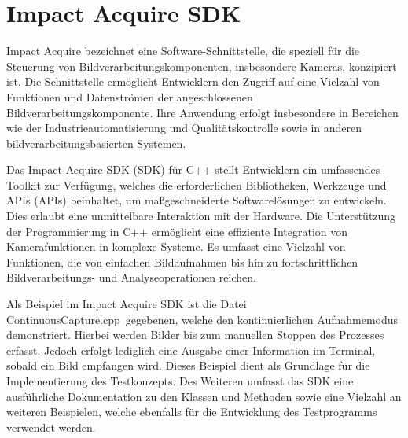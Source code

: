 \section{Impact Acquire SDK}

Impact Acquire bezeichnet eine Software-Schnittstelle, die speziell für die Steuerung von Bildverarbeitungskomponenten, insbesondere Kameras, konzipiert ist. 
Die Schnittstelle ermöglicht Entwicklern den Zugriff auf eine Vielzahl von Funktionen und Datenströmen der angeschlossenen Bildverarbeitungskomponente. 
Ihre Anwendung erfolgt insbesondere in Bereichen wie der Industrieautomatisierung und Qualitätskontrolle sowie in anderen bildverarbeitungsbasierten Systemen.

Das Impact Acquire \acs{SDK} (\acl{SDK}) für C++ stellt Entwicklern ein umfassendes Toolkit zur Verfügung, welches die erforderlichen Bibliotheken, Werkzeuge 
und \acl{API}s (\acs{API}s) beinhaltet, um maßgeschneiderte Softwarelösungen zu entwickeln. Dies erlaubt eine unmittelbare Interaktion mit der Hardware. 
Die Unterstützung der Programmierung in C++ ermöglicht eine effiziente Integration von Kamerafunktionen in komplexe Systeme. Es umfasst eine Vielzahl von Funktionen, die 
von einfachen Bildaufnahmen bis hin zu fortschrittlichen Bildverarbeitungs- und Analyseoperationen reichen.

Als Beispiel im Impact Acquire SDK ist die Datei \glqq ContinuousCapture.cpp\grqq\ gegebenen, welche den kontinuierlichen Aufnahmemodus demonstriert. Hierbei werden Bilder bis zum manuellen 
Stoppen des Prozesses erfasst. Jedoch erfolgt lediglich eine Ausgabe einer Information im Terminal, sobald ein Bild empfangen wird. Dieses Beispiel dient als Grundlage für 
die Implementierung des Testkonzepts. Des Weiteren umfasst das SDK eine ausführliche Dokumentation 
zu den Klassen und Methoden sowie eine Vielzahl an weiteren Beispielen, welche ebenfalls für die Entwicklung des Testprogramms verwendet werden.

\citep{BalluffSDK} \citep{BalluffMVS}